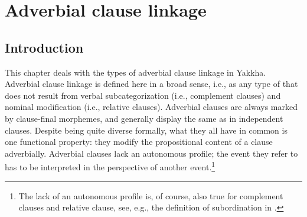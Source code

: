 \chapter{Adverbial clause linkage}\label{adv-cl}


\section{Introduction}

This chapter deals with the types of adverbial clause linkage in Yakkha. Adverbial clause linkage is defined here in a broad sense, i.e., as any type of  that does not result from verbal subcategorization (i.e., complement clauses) and nominal modification (i.e., relative clauses). Adverbial clauses are always marked by clause-final morphemes, and generally display the same  as in independent clauses. 
Despite being quite diverse formally, what they all have in common is one functional property: they modify the propositional content of a clause adverbially. Adverbial clauses lack an autonomous profile; the event they refer to has to be interpreted in the perspective of another event.\footnote{The lack of an autonomous profile is, of course, also true for complement clauses and relative clause, see, e.g., the definition of subordination in \citet{Cristofaro2003Subordination}.}


